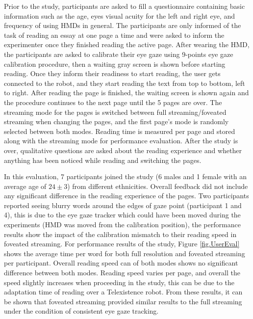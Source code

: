Prior to the study, participants are asked to fill a questionnaire containing basic information such as the age, eyes visual acuity for the left and right eye, and frequency of using HMDs in general. The participants are only informed of the task of reading an essay at one page a time and were asked to inform the experimenter once they finished reading the active page. After wearing the HMD, the participants are asked to calibrate their eye gaze using 9-points eye gaze calibration procedure, then a waiting gray screen is shown before starting reading. Once they inform their readiness to start reading, the user gets connected to the robot, and they start reading the text from top to bottom, left to right. After reading the page is finished, the waiting screen is shown again and the procedure continues to the next page until the 5 pages are over. The streaming mode for the pages is switched between full streaming/foveated streaming when changing the pages, and the first page's mode is randomly selected between both modes. Reading time is measured per page and stored along with the streaming mode for performance evaluation. After the study is over, qualitative questions are asked about the reading experience and whether anything has been noticed while reading and switching the pages.  

 In this evaluation, 7 participants joined the study (6 males and 1 female with an average age of $24\pm 3$) from different ethnicities. Overall feedback did not include any significant difference in the reading experience of the pages. Two participants reported seeing blurry words around the edges of gaze point (participant 1 and 4), this is due to the eye gaze tracker which could have been moved during the experiments (HMD was moved from the calibration position), the performance results show the impact of the calibration mismatch to their reading speed in foveated streaming. For performance results of the study, Figure \ref{fig.UserEval} shows the average time per word for both full resolution and foveated streaming per participant. Overall reading speed can of both modes shows no significant difference between both modes. Reading speed varies per page, and overall the speed slightly increases when proceeding in the study, this can be due to the adaptation time of reading over a Telexistence robot. From these results, it can be shown that foveated streaming provided similar results to the full streaming under the condition of consistent eye gaze tracking.
